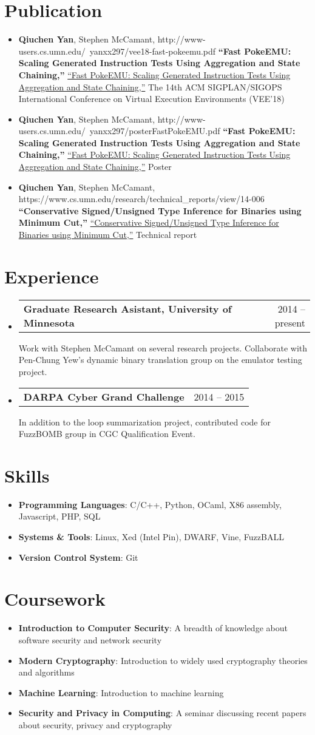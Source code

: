 \documentclass[letterpaper,11pt]{article}
\makeatletter
\newcommand{\resumeItem}[2]{
  \item[]\small{
    \textbf{#1}{: #2 \vspace{-2pt}}
  }
}
\newcommand{\projectSubheading}[3]{
  \vspace{-1pt}\item[]
  \begin{tabular*}{0.97\textwidth}{l@{\extracolsep{\fill}}r}
  \textbf{\small#1} & {\small#2}\\
  \end{tabular*}
      {\small#3}\vspace{-5pt}
}
\newcommand{\bibSubheading}[4]{
  \vspace{-1pt}\item[]
      {\small#2},
      \ifx\hfuzz#4\hfuzz
      \textbf{\small``#1,''}      
      \else
      \href{#4}{\small``#1,''}
      \fi      
      \small{#3}
    \vspace{-2pt}
}
\newcommand{\resumeSubHeadingListStart}{\begin{itemize}[leftmargin=*]}
\newcommand{\resumeSubHeadingListEnd}{\end{itemize}}
\makeatother
\begin{document}
%
\section{Publication}
	\resumeSubHeadingListStart
    	\bibSubheading{Fast PokeEMU: Scaling Generated Instruction Tests Using 
        Aggregation and State Chaining}
        {\textbf{Qiuchen Yan}, Stephen McCamant}
        {The 14th ACM SIGPLAN/SIGOPS International Conference on Virtual Execution Environments (VEE'18)}
        {http://www-users.cs.umn.edu/~yanxx297/vee18-fast-pokeemu.pdf}
    	\bibSubheading{Fast PokeEMU: Scaling Generated Instruction Tests Using 
      Aggregation and State Chaining}
        {\textbf{Qiuchen Yan}, Stephen McCamant}
        {Poster}
        {http://www-users.cs.umn.edu/~yanxx297/posterFastPokeEMU.pdf}     
        \bibSubheading{Conservative Signed/Unsigned Type Inference for Binaries
        using Minimum Cut}
        {\textbf{Qiuchen Yan}, Stephen McCamant}
        {Technical report}
        {https://www.cs.umn.edu/research/technical_reports/view/14-006}             
    \resumeSubHeadingListEnd         

%
\section{Experience}
  \resumeSubHeadingListStart
  \projectSubheading
      {Graduate Research Asistant, University of Minnesota}{2014 -- present}
      {Work with Stephen McCamant on several research projects. 
      Collaborate with Pen-Chung Yew's dynamic binary translation group on the emulator testing project.}    
    \projectSubheading
      {DARPA Cyber Grand Challenge}{2014 -- 2015}
      {In addition to the loop summarization project, contributed code for 
      FuzzBOMB group in CGC Qualification Event.}  
  \resumeSubHeadingListEnd
  
  
%
\section{Skills}	
 \resumeSubHeadingListStart
 	\resumeItem{Programming Languages}
    {C/C++, Python, OCaml, X86 assembly, Javascript, PHP, SQL} 
  \resumeItem{Systems \& Tools}
    {Linux, Xed (Intel Pin), DWARF, Vine, FuzzBALL}
  \resumeItem{Version Control System}{Git}
 \resumeSubHeadingListEnd

%
\section{Coursework}
  \resumeSubHeadingListStart
    \resumeItem
      {Introduction to Computer Security}
      {A breadth of knowledge about software security and network security}   
    \resumeItem
      {Modern Cryptography}
      {Introduction to widely used cryptography theories and algorithms}
    \resumeItem
      {Machine Learning}
      {Introduction to machine learning}      
    \resumeItem
      {Security and Privacy in Computing}
      {A seminar discussing recent papers about security, privacy and cryptography}
  \resumeSubHeadingListEnd  
\end{document}
